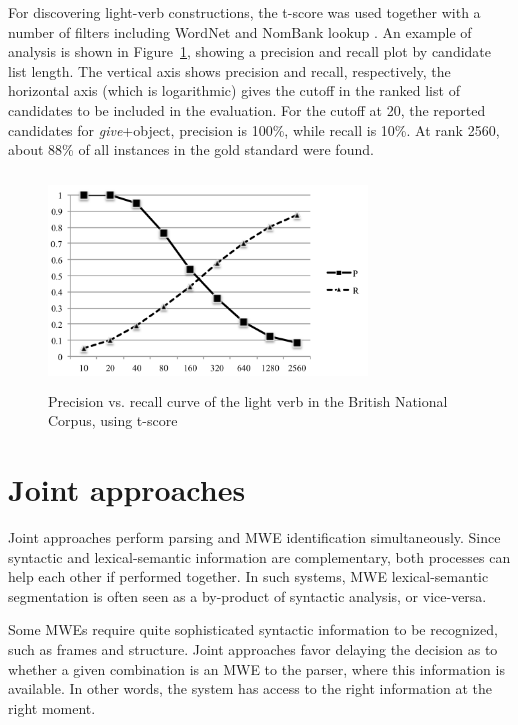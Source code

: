 \documentclass[output=paper]{langsci/langscibook}
\begin{document}
For discovering light-verb constructions, the t-score was used together with a number of filters including WordNet and NomBank lookup \citep{ronan_schneider_mwe_15}. 
An example of analysis is shown in Figure~\ref{con:discover-lightverbs}, showing a precision and recall plot by candidate list length. The vertical axis shows precision and recall, respectively, the horizontal axis (which is logarithmic) gives the cutoff in the ranked list of candidates to be included in the evaluation. For the cutoff at 20, the reported candidates for \emph{give}+object, precision is 100\%, while recall is 10\%. At rank 2560, about 88\% of all instances in the gold standard were found.

\begin{figure}
\includegraphics[width=240pt,height=160pt]{figures/ICAME_2013_27_BW1}
\caption{Precision vs. recall curve of the light verb  in the British National Corpus, using t-score \citep{ronan_schneider_mwe_15}}
\label{con:discover-lightverbs}
\end{figure}


%
\section{Joint approaches}
\label{con:sec:joint}

Joint approaches perform parsing and MWE identification simultaneously.
Since syntactic and lexical-semantic information are complementary, both processes can help each other if performed together.
In such systems, MWE lexical-seman\-tic segmentation is often seen as a by-product of syntactic analysis, or vice-versa.

Some MWEs require quite sophisticated syntactic information to be recognized, such as  frames and  structure.
Joint approaches favor delaying the decision as to whether a given combination is an MWE to the parser, where this information is available.
In other words, the system has access to the right information at the right moment. %
\end{document}
